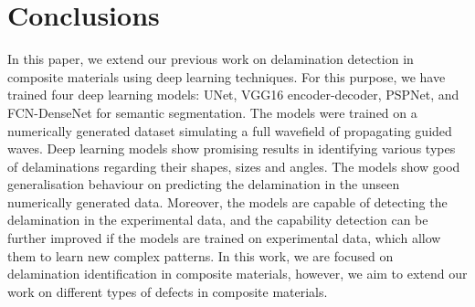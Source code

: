 \section{Conclusions}
In this paper, we extend our previous work on delamination detection in composite materials using deep learning techniques. 
For this purpose, we have trained four deep learning models: UNet, VGG16 encoder-decoder, PSPNet, and  FCN-DenseNet for semantic segmentation.
The models were trained on a numerically generated dataset simulating a  full wavefield of propagating guided waves.
Deep learning models show promising results in identifying various types of delaminations regarding their shapes, sizes and angles. 
The models show good generalisation behaviour on predicting the delamination in the unseen numerically generated data.
Moreover, the models are capable of detecting the delamination in the experimental data, and the capability detection can be further improved if the models are trained on experimental data, which allow them to learn new complex patterns.
In this work, we are focused on delamination identification in composite materials, however, we aim to extend our work on different types of defects in composite materials.
